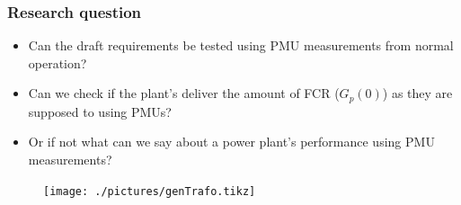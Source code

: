 \begin{frame}
	\frametitle{Research question}
	\begin{itemize}
		\item Can the draft requirements be tested using PMU measurements from normal operation?
		\item Can we check if the plant's deliver the amount of FCR ($G_p(0)$) as they are supposed to using PMUs?
		\item Or if not what can we say about a power plant's performance using PMU measurements?
\end{itemize}
	\begin{figure}
		\texttt{[image: ./pictures/genTrafo.tikz]}
	\end{figure}
\end{frame}
